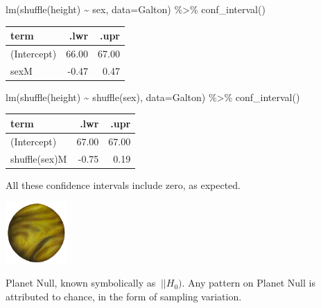 \documentclass[
  letterpaper,
  DIV=11,
  numbers=noendperiod,
  oneside]{scrreprt}
\newenvironment{Shaded}{\begin{snugshade}}{\end{snugshade}}
\newcommand{\AttributeTok}[1]{\textcolor[rgb]{0.40,0.45,0.13}{#1}}
\newcommand{\FunctionTok}[1]{\textcolor[rgb]{0.28,0.35,0.67}{#1}}
\newcommand{\NormalTok}[1]{\textcolor[rgb]{0.00,0.23,0.31}{#1}}
\newcommand{\SpecialCharTok}[1]{\textcolor[rgb]{0.37,0.37,0.37}{#1}}
\begin{document}
\begin{Shaded}
\begin{Highlighting}[]
\FunctionTok{lm}\NormalTok{(}\FunctionTok{shuffle}\NormalTok{(height) }\SpecialCharTok{\textasciitilde{}}\NormalTok{ sex, }\AttributeTok{data=}\NormalTok{Galton) }\SpecialCharTok{\%\textgreater{}\%} \FunctionTok{conf\_interval}\NormalTok{()}
\end{Highlighting}
\end{Shaded}

\ttfamily 
\begin{tabular}{lrr}
\toprule
term & .lwr & .upr\\
\midrule
(Intercept) & 66.00 & 67.00\\
sexM & -0.47 & 0.47\\
\bottomrule
\end{tabular} \normalfont
\bigskip

\begin{Shaded}
\begin{Highlighting}[]
\FunctionTok{lm}\NormalTok{(}\FunctionTok{shuffle}\NormalTok{(height) }\SpecialCharTok{\textasciitilde{}} \FunctionTok{shuffle}\NormalTok{(sex), }\AttributeTok{data=}\NormalTok{Galton) }\SpecialCharTok{\%\textgreater{}\%} \FunctionTok{conf\_interval}\NormalTok{()}
\end{Highlighting}
\end{Shaded}

\ttfamily 
\begin{tabular}{lrr}
\toprule
term & .lwr & .upr\\
\midrule
(Intercept) & 67.00 & 67.00\\
shuffle(sex)M & -0.75 & 0.19\\
\bottomrule
\end{tabular} \normalfont
\bigskip

All these confidence intervals include zero, as expected.

\begin{marginfigure}

{\centering \includegraphics[width=0.93in,height=\textheight]{./www/planet-null.png}

}

\caption{\label{fig-planet-null}Planet Null, known symbolically as
\(\ |\!\!| H_0)\). Any pattern on Planet Null is attributed to chance,
in the form of sampling variation.}

\end{marginfigure}
\end{document}

